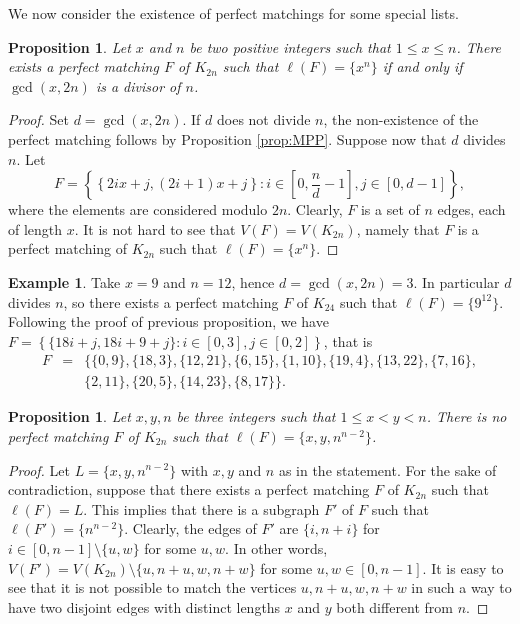 \documentclass{amsart}
\newtheorem{prop}[defi]{Proposition}
\theoremstyle{definition}
\newtheorem{ex}[defi]{Example}
\numberwithin{equation}{section}
\begin{document}
We now consider the existence of perfect matchings for some special lists.

\begin{prop}\label{prop:xn}
Let $x$ and $n$ be two positive integers such that $1\leq x \leq n$.
There exists a perfect matching $F$ of $K_{2n}$ such that $\ell(F)=\{x^n\}$
if and only if $\gcd(x,2n)$ is a divisor of $n$.
\end{prop}

\begin{proof}
Set $d=\gcd(x,2n)$. If $d$ does not divide $n$, the non-existence of the perfect matching follows by Proposition \ref{prop:MPP}.
Suppose now that $d$ divides $n$. Let
$$F=\left\{\left\{2ix+j,(2i+1)x+j\right\}: i\in\left[0,\frac{n}{d}-1\right], j \in\left[0,d-1\right]\right\},$$
where the elements are considered modulo $2n$.
Clearly, $F$ is a set of $n$ edges, each of length $x$.
It is not hard to see that $V(F)=V(K_{2n})$, namely that $F$ is a perfect matching of $K_{2n}$ such that $\ell(F)=\{x^n\}$.
\end{proof}

\begin{ex}
Take $x=9$ and $n=12$, hence $d=\gcd(x,2n)=3$. In particular $d$ divides $n$, so there exists a perfect matching
$F$ of $K_{24}$ such that $\ell(F)=\{9^{12}\}$. Following the proof of previous proposition, we have
$F=\left\{\{18i+j,18i+9+j\}: i\in [0,3], j \in [0,2]\right\}$,
that is
$$\begin{array}{rcl}
F &=& \{\{0,9\},\{18,3\},\{12,21\},\{6,15\},\{1,10\},\{19,4\},\{13,22\},\{7,16\},\\
 &&\{2,11\},\{20,5\},\{14,23\},\{8,17\}\}.
\end{array}$$
\end{ex}


\begin{prop}
Let $x,y,n$ be three integers such that $1\leq x< y <n$.
There is no perfect matching $F$ of $K_{2n}$ such that $\ell(F)=\{x,y,n^{n-2}\}$.
\end{prop}
\begin{proof}
Let $L=\{x,y,n^{n-2}\}$ with $x,y$ and $n$ as in the statement.
For the sake of contradiction, suppose that there exists a perfect matching $F$ of $K_{2n}$ such that $\ell(F)=L$.
This implies that there is a subgraph $F'$ of $F$ such that $\ell(F')=\{n^{n-2}\}$.
Clearly, the edges of $F'$ are  $\{i,n+i\}$ for $i\in[0,n-1]\setminus \{u,w\}$ for some $u,w$.
In other words, $V(F')=V(K_{2n})\setminus\{u,n+u,w,n+w\}$ for some $u,w\in[0,n-1]$.
It is easy to see that it is not possible to match the vertices $u,n+u,w,n+w$ in such a way to have two disjoint edges
with distinct lengths $x$ and $y$ both different from $n$.
\end{proof}
\end{document}
